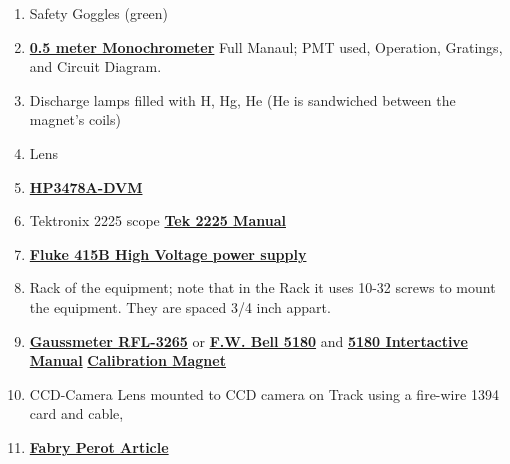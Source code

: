 \documentclass{../lab}
\begin{document}
\begin{enumerate}
    \item Safety Goggles (green)

    \item \href{http://physics111.lib.berkeley.edu/Physics111/Reprints/ATM/ARC\%20Model\%20AM505\%20scanning\%20monochromator.pdf}{\textbf{0.5 meter Monochrometer}} Full Manaul; PMT used, Operation, Gratings, and Circuit Diagram.

    \item Discharge lamps filled with H, Hg, He (He is sandwiched between the magnet's coils)

    \item Lens

    \item \href{http://physics111.lib.berkeley.edu/Physics111/Equipment\_Manuals/Hewlett\%20Packard/hp3478a\%20multimeter.pdf}{\textbf{HP3478A-DVM}}

    \item Tektronix 2225 scope \href{http://physics111.lib.berkeley.edu/Physics111/Equipment\_Manuals/Tektronix/OCR\%202225\%20Tektronix\%20\%20Oscilloscope\%20operating\%20manual.pdf}{\textbf{Tek 2225 Manual}}

    \item \href{http://physics111.lib.berkeley.edu/Physics111/Equipment\_Manuals/Fluke/GMA\%20OCR\%20Fluke\%20415B\%20power\%20supply.pdf}{\textbf{Fluke 415B High Voltage power supply}}

    \item Rack of the equipment; note that in the Rack it uses 10-32 screws to mount the equipment. They are spaced 3/4 inch appart.

    \item \href{http://physics111.lib.berkeley.edu/Physics111/Reprints/ATM/RFL\%203265\%20Gaussmeter.pdf}{\textbf{Gaussmeter RFL-3265}} or \href{http://physics111.lib.berkeley.edu/Physics111/Reprints/ATM/Gaussmeter5180.pdf}{\textbf{F.W. Bell 5180}} and \href{http://physics111.lib.berkeley.edu/Physics111/Reprints/ATM/5180Manual.exe}{\textbf{5180 Intertactive Manual}} \href{http://physics111.lib.berkeley.edu/Physics111/Reprints/ATM/Cal\_mag\_Guass\_Meter\_sm.jpg}{\textbf{Calibration Magnet}}

    \item CCD-Camera Lens mounted to CCD camera on Track using a fire-wire 1394 card and cable,

    \item \href{http://physics111.lib.berkeley.edu/Physics111/Reprints/ATM/OCR\%20Burleigh\%20tech\%20memo\%20fabry\%20perots.pdf}{\textbf{Fabry Perot Article}}


\end{enumerate}
\end{document}
